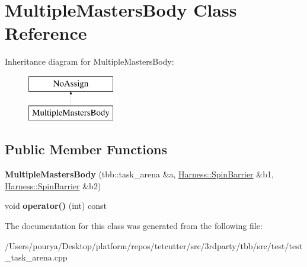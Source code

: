 \hypertarget{classMultipleMastersBody}{}\section{Multiple\+Masters\+Body Class Reference}
\label{classMultipleMastersBody}
Inheritance diagram for Multiple\+Masters\+Body\+:\begin{figure}[H]
\begin{center}
\leavevmode
\includegraphics[height=2.000000cm]{classMultipleMastersBody}
\end{center}
\end{figure}
\subsection*{Public Member Functions}
\begin{DoxyCompactItemize}
\item 
\hypertarget{classMultipleMastersBody_ac6da978586c6f81a52f05de40f4711fc}{}{\bfseries Multiple\+Masters\+Body} (tbb\+::task\+\_\+arena \&a, \hyperlink{classHarness_1_1SpinBarrier}{Harness\+::\+Spin\+Barrier} \&b1, \hyperlink{classHarness_1_1SpinBarrier}{Harness\+::\+Spin\+Barrier} \&b2)\label{classMultipleMastersBody_ac6da978586c6f81a52f05de40f4711fc}

\item 
\hypertarget{classMultipleMastersBody_a0cc0af5693220ccbdbfd664fecb9fd02}{}void {\bfseries operator()} (int) const \label{classMultipleMastersBody_a0cc0af5693220ccbdbfd664fecb9fd02}

\end{DoxyCompactItemize}


The documentation for this class was generated from the following file\+:\begin{DoxyCompactItemize}
\item 
/\+Users/pourya/\+Desktop/platform/repos/tetcutter/src/3rdparty/tbb/src/test/test\+\_\+task\+\_\+arena.\+cpp\end{DoxyCompactItemize}
